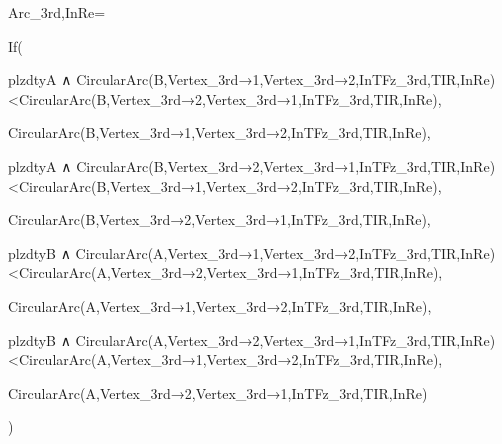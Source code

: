 Arc_{3rd,InRe}=

  If(

    plzdtyA ∧ CircularArc(B,Vertex_{3rd→1},Vertex_{3rd→2},InTFz_{3rd,TIR,InRe})<CircularArc(B,Vertex_{3rd→2},Vertex_{3rd→1},InTFz_{3rd,TIR,InRe}),
    
    CircularArc(B,Vertex_{3rd→1},Vertex_{3rd→2},InTFz_{3rd,TIR,InRe}),

    plzdtyA ∧ CircularArc(B,Vertex_{3rd→2},Vertex_{3rd→1},InTFz_{3rd,TIR,InRe})<CircularArc(B,Vertex_{3rd→1},Vertex_{3rd→2},InTFz_{3rd,TIR,InRe}),

    CircularArc(B,Vertex_{3rd→2},Vertex_{3rd→1},InTFz_{3rd,TIR,InRe}),

    plzdtyB ∧ CircularArc(A,Vertex_{3rd→1},Vertex_{3rd→2},InTFz_{3rd,TIR,InRe})<CircularArc(A,Vertex_{3rd→2},Vertex_{3rd→1},InTFz_{3rd,TIR,InRe}),

    CircularArc(A,Vertex_{3rd→1},Vertex_{3rd→2},InTFz_{3rd,TIR,InRe}),
    
    plzdtyB ∧ CircularArc(A,Vertex_{3rd→2},Vertex_{3rd→1},InTFz_{3rd,TIR,InRe})<CircularArc(A,Vertex_{3rd→1},Vertex_{3rd→2},InTFz_{3rd,TIR,InRe}),
    
    CircularArc(A,Vertex_{3rd→2},Vertex_{3rd→1},InTFz_{3rd,TIR,InRe})
    
  )